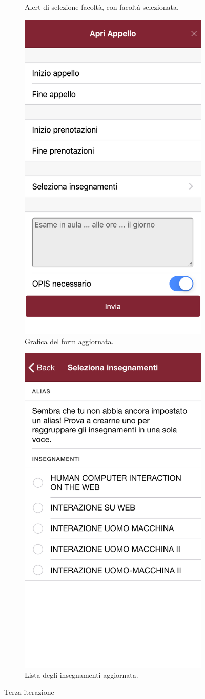 \documentclass[Lau, oneside, noexaminfo]{sapthesis}%
\begin{document}
\begin{figure}[H]
\begin{subfigure}{0.6\textwidth}
	  \caption{Alert di selezione facoltà, con facoltà selezionata.}
	\end{subfigure}
	\begin{subfigure}{0.6\textwidth}
		\centering
		\includegraphics[width=0.5\linewidth]{ui-iterations/iii/form}  
		\caption{Grafica del form aggiornata.}
	  \end{subfigure}
	  \begin{subfigure}{0.6\textwidth}
		\centering
		\includegraphics[width=0.5\linewidth]{ui-iterations/iii/insegnamenti}
		\caption{Lista degli insegnamenti aggiornata.}
	  \end{subfigure}
	  
	\caption{Terza iterazione}
	\label{fig:it-3}
\end{figure}
\end{document}
